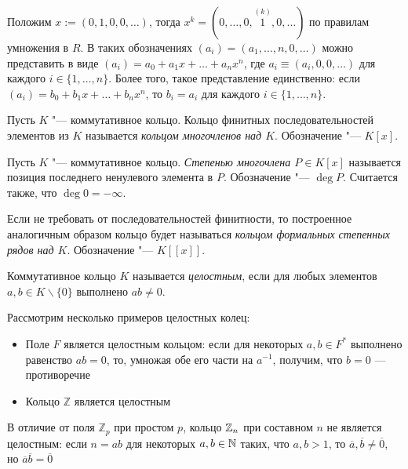 \begin{note}
	Положим $x := (0, 1, 0, 0, \dots)$, тогда $x^k = (0, \dotsc, 0, \overset{(k)}{1}, 0, \dotsc)$ по правилам умножения в $R$. В таких обозначениях $(a_i) = (a_1, \dotsc, n, 0, \dotsc)$ можно представить в виде $(a_i) = a_0 + a_1x + \dots + a_nx^n$, где $a_i \equiv (a_i, 0, 0,\dots)$ для каждого $i \in \{1, \dotsc, n\}$. Более того, такое представление единственно: если $(a_i) = b_0 + b_1x + \dots + b_nx^n$, то $b_i = a_i$ для каждого $i \in \{1, \dotsc, n\}$.
\end{note}

\begin{definition}
	Пусть $K$ "--- коммутативное кольцо. Кольцо финитных последовательностей элементов из $K$ называется \textit{кольцом многочленов над $K$}. Обозначение "--- $K[x]$.
\end{definition}

\begin{definition}
	Пусть $K$ "--- коммутативное кольцо. \textit{Степенью многочлена $P \in K[x]$} называется позиция последнего ненулевого элемента в $P$. Обозначение "--- $\deg{P}$. Считается также, что $\deg{0} = -\infty$.
\end{definition}

\begin{note}
	Если не требовать от последовательностей финитности, то построенное аналогичным образом кольцо будет называться \textit{кольцом формальных степенных рядов над $K$}. Обозначение "--- $K[[x]]$.
\end{note}

\begin{definition}
	Коммутативное кольцо $K$ называется \textit{целостным}, если для любых элементов $a, b \in K \backslash \{0\}$ выполнено $ab \ne 0$.
\end{definition}

\begin{example}
	Рассмотрим несколько примеров целостных колец:
	\begin{itemize}
		\item Поле $F$ является целостным кольцом: если для некоторых $a, b \in F^*$ выполнено равенство $ab = 0$, то, умножая обе его части на $a^{-1}$, получим, что $b = 0$ --- противоречие
		\item Кольцо $\mathbb{Z}$ является целостным
	\end{itemize}
\end{example}

\begin{note}
	В отличие от поля $\mathbb{Z}_p$ при простом $p$, кольцо $\mathbb{Z}_n$ при составном $n$ не является целостным: если $n = ab$ для некоторых $a, b \in \mathbb{N}$ таких, что $a, b > 1$, то $\overline{a}, \overline{b} \ne \overline{0}$, но $\overline{a}\overline{b} = \overline{0}$
\end{note}

